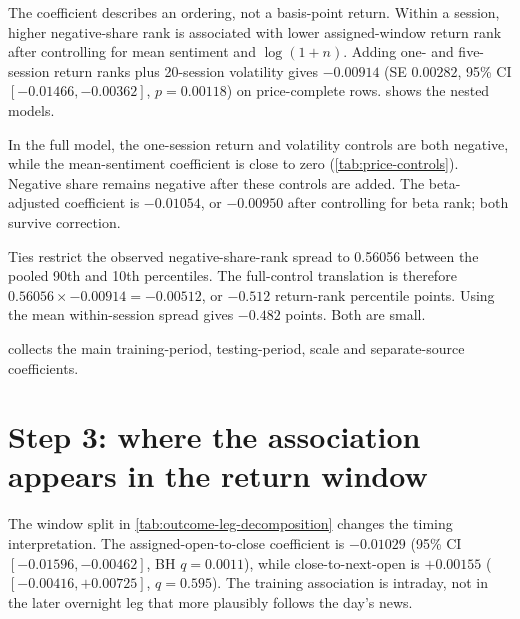 The coefficient describes an ordering, not a basis-point return. Within a
session, higher negative-share rank is associated with lower assigned-window
return rank after controlling for mean sentiment and $\log(1+n)$. Adding
one- and five-session return ranks plus 20-session volatility gives $-0.00914$
(SE $0.00282$, 95\% CI $[-0.01466,-0.00362]$, $p=0.00118$) on price-complete
rows.  shows the nested models.

\begin{table}[htbp]
  \centering
  \caption[Price-path control coefficients]{Negative-story-share coefficient as recent-return and volatility controls are added. All variables use average-tie percentile ranks shifted by one half within session.}
  \label{tab:price-controls}
  \small
  
\end{table}

In the full model, the one-session return and volatility controls are both
negative, while the mean-sentiment coefficient is close to zero
(\cref{tab:price-controls}). Negative share remains negative after these controls
are added. The beta-adjusted coefficient is $-0.01054$, or $-0.00950$ after
controlling for beta rank; both survive correction.

Ties restrict the observed negative-share-rank spread to 0.56056 between the
pooled 90th and 10th percentiles. The full-control translation is therefore
$0.56056\times-0.00914=-0.00512$, or $-0.512$ return-rank percentile points.
Using the mean within-session spread gives $-0.482$ points. Both are small.

 collects the main training-period, testing-period,
scale and separate-source coefficients.


\section{Step 3: where the association appears in the return window}
\label{sec:outcome-leg-decomposition}

The window split in \cref{tab:outcome-leg-decomposition} changes the timing
interpretation. The assigned-open-to-close coefficient is $-0.01029$ (95\% CI
$[-0.01596,-0.00462]$, BH $q=0.0011$), while close-to-next-open is $+0.00155$
($[-0.00416,+0.00725]$, $q=0.595$). The training association is intraday, not in
the later overnight leg that more plausibly follows the day's news.

